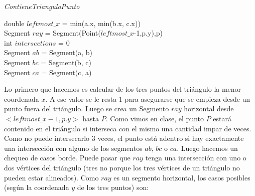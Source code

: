 \begin{algorithm}[H]
	\caption{\textit{ContieneTrianguloPunto}}
	double $leftmost\_x$ = min(a.x, min(b.x, c.x)) \\
	Segment $ray$ = Segment(Point($leftmost\_x$-1,p.y),p) \\
	int $intersections$ = 0 \\
	Segment $ab$ = Segment(a, b) \\
	Segment $bc$ = Segment(b, c) \\
	Segment $ca$ = Segment(c, a) \\
\end{algorithm}

Lo primero que hacemos es calcular de los tres puntos del triángulo la menor coordenada $x$. A ese valor se
le resta 1 para asegurarse que se empieza desde un punto fuera del triángulo. Luego se crea un Segmento $ray$
horizontal desde $<leftmost\_x-1, p.y>$ hasta $P$. Como vimos en clase, el punto $P$ estará contenido en el 
triángulo si interseca con el mismo una cantidad impar de veces. Como no puede intersecarlo 3 veces, el punto
está adentro si hay exactamente una intersección con alguno de los segmentos $ab$, $bc$ o $ca$.
Luego hacemos un chequeo de casos borde. Puede pasar que $ray$ tenga una intersección con uno o dos vértices
del triángulo (tres no porque los tres vértices de un triángulo no pueden estar alineados). Como $ray$ es un
segmento horizontal, los casos posibles (según la coordenada $y$ de los tres puntos) son: 

